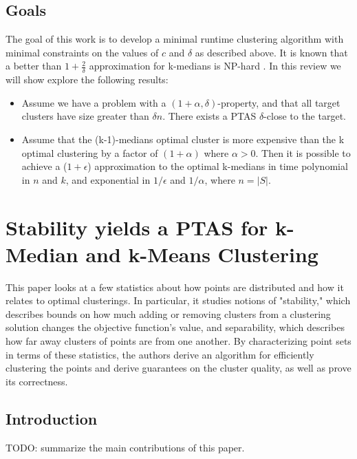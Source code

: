 \documentclass[paper=a4, fontsize=11pt]{scrartcl} %
\numberwithin{equation}{section} %
\numberwithin{figure}{section} %
\numberwithin{table}{section} %
\begin{document}
\subsection{Goals}

The goal of this work is to develop a minimal runtime clustering algorithm with minimal constraints on the values of $c$ and $\delta$ as described above. It is known that a better than $1 + \frac{2}{\delta}$ approximation for k-medians is NP-hard \cite{thethingthepapercitesJMS02}. In this review we will show explore the following results:

\begin{itemize}

\item Assume we have a problem with a $(1+\alpha, \delta)$-property, and that all target clusters have size greater than $\delta n$. There exists a PTAS $\delta$-close to the target.

\item Assume that the (k-1)-medians optimal cluster is more expensive than the k optimal clustering by a factor of $(1+\alpha)$ where $\alpha > 0$. Then it is possible to achieve a ($1+\epsilon$) approximation to the optimal k-medians in time polynomial in $n$ and $k$, and exponential in $1/\epsilon$ and $1/\alpha$, where $n = |S|$.

\end{itemize}


\section{Stability yields a PTAS for k-Median and k-Means Clustering}

This paper looks at a few statistics about how points are distributed and how it relates to optimal clusterings.  In particular, it studies notions of "stability," which describes bounds on how much adding or removing clusters from a clustering solution changes the objective function's value, and separability, which describes how far away clusters of points are from one another.  By characterizing point sets in terms of these statistics, the authors derive an algorithm for efficiently clustering the points and derive guarantees on the cluster quality, as well as prove its correctness.

\subsection{Introduction}
TODO: summarize the main contributions of this paper.
\end{document}
